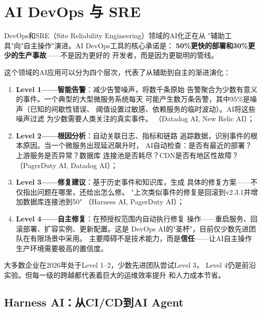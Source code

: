 \section{AI DevOps 与 SRE}
\label{sec:devtools-devops}

DevOps和SRE（Site Reliability Engineering）领域的AI化正在从
"辅助工具"向"自主操作"演进。AI DevOps工具的核心承诺是：
\textbf{50\%更快的部署和30\%更少的生产事故}——不是因为更好的
开发者，而是因为更聪明的管线。

这个领域的AI应用可以分为四个层次，代表了从辅助到自主的渐进演化：

\begin{enumerate}
  \item \textbf{Level 1——智能告警}：减少告警噪声，将数千条原始
    告警聚合为少数有意义的事件。一个典型的大型微服务系统每天
    可能产生数万条告警，其中95\%是噪声（已知的间歇性错误、
    阈值设置过敏感、依赖服务的临时波动）。AI将这些噪声过滤
    为少数需要人类关注的真实事件。
    （Datadog AI, New Relic AI）；
  \item \textbf{Level 2——根因分析}：自动关联日志、指标和链路
    追踪数据，识别事件的根本原因。当一个微服务出现延迟飙升时，
    AI自动检查：是否有最近的部署？上游服务是否异常？数据库
    连接池是否耗尽？CDN是否有地区性故障？
    （PagerDuty AI, Datadog AI）；
  \item \textbf{Level 3——修复建议}：基于历史事件和知识库，生成
    具体的修复方案——不仅指出问题在哪里，还给出怎么修。
    "上次类似事件的修复是回滚到v2.3.1并增加数据库连接池到50"
    （Harness AI, PagerDuty AI）；
  \item \textbf{Level 4——自主修复}：在预授权范围内自动执行修复
    操作——重启服务、回滚部署、扩容实例、更新配置。这是
    DevOps AI的"圣杯"，目前仅少数先进团队在有限场景中采用。
    主要障碍不是技术能力，而是\textbf{信任}——让AI自主操作
    生产环境需要极高的置信度。
\end{enumerate}

大多数企业在2026年处于Level 1--2，少数先进团队尝试Level 3，
Level 4仍是前沿实验。但每一级的跨越都代表着巨大的运维效率提升
和人力成本节省。

\subsection{Harness AI：从CI/CD到AI Agent}
\label{subsec:harness}

